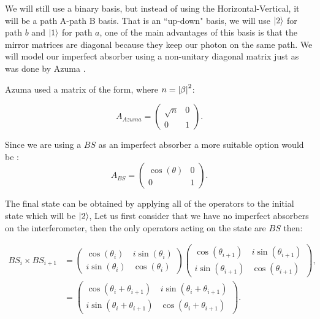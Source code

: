 \documentclass{book}
\begin{document}
 We will still use a binary basis, but instead of using the Horizontal-Vertical, it will be a path A-path B basis. That is an ``up-down" basis, we will use $\ket{2}$ for path $b$ and $\ket{1}$ for path $a$, one of the main advantages of this basis is that the mirror matrices are diagonal because they keep our photon on the same path. We will model our imperfect absorber using a non-unitary diagonal matrix just as was done by  Azuma \cite{Azuma}.   
 
 Azuma used a matrix of the form, where $n=\abs{\beta}^{2}$:
 
 \begin{equation}
 A_{Azuma}=\begin{pmatrix} \sqrt{n} & 0\\0& 1\end{pmatrix}.
\label{absorber}
 \end{equation}

Since we are using a $BS$ as an imperfect absorber a more suitable option would be :
\begin{equation}
 A_{BS}=\begin{pmatrix} \cos(\theta) & 0\\0& 1\end{pmatrix}.
\label{absorber1}
\end{equation}

The final state can be obtained by applying all of the operators to the initial state which will be $\ket{2}$, Let us first consider that we have no imperfect absorbers on the interferometer, then the only operators acting on the state are $BS$ then:

\begin{align}
BS_{i} \times BS_{i+1}&=\begin{pmatrix} \cos(\theta_{i}) & i \sin(\theta_{i}) \\ i \sin(\theta_{i}) & \cos(\theta_{i}) \end{pmatrix}  
\begin{pmatrix} \cos(\theta_{i+1}) & i \sin(\theta_{i+1}) \\ i \sin(\theta_{i+1}) & \cos(\theta_{i+1}) \end{pmatrix},\\
&=\begin{pmatrix} \cos(\theta_{i}+\theta_{i+1}) & i \sin(\theta_{i}+\theta_{i+1}) \\ i \sin(\theta_{i}+\theta_{i+1}) & \cos(\theta_{i}+\theta_{i+1}) \end{pmatrix}.
\end{align}
\end{document}
